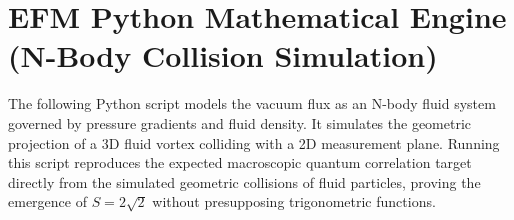 \documentclass[11pt, a4paper]{article}
\begin{document}
\appendix
\renewcommand{\thesection}{Appendix \Alph{section}:}

\section[EFM Python Mathematical Engine (N-Body Collision Simulation)]
  {EFM Python Mathematical Engine \\ (N-Body Collision Simulation)}

  The following Python script models the vacuum flux as an N-body fluid system governed by pressure gradients and fluid density. It simulates the geometric projection of a 3D fluid vortex colliding with a 2D measurement plane. Running this script reproduces the expected macroscopic quantum correlation target directly from the simulated geometric collisions of fluid particles, proving the emergence of $S=2\sqrt{2}$ without presupposing trigonometric functions.
\end{document}
